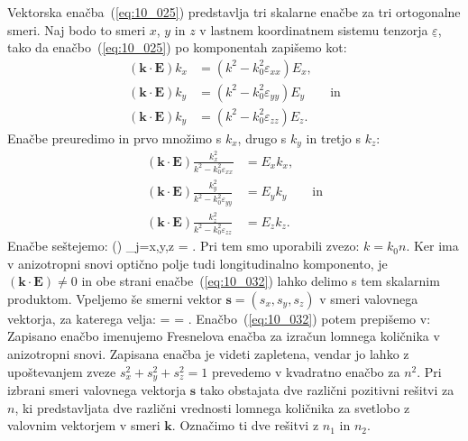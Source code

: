 Vektorska enačba~(\ref{eq:10_025}) predstavlja tri skalarne enačbe za tri 
ortogonalne smeri. Naj bodo to smeri $x$, $y$ in $z$ v lastnem koordinatnem sistemu
tenzorja $\underline{\varepsilon}$, tako da enačbo~(\ref{eq:10_025}) po komponentah 
zapišemo kot:
\begin{align}
\left(\mathbf{k}\cdot \mathbf{E}\right) k_x &= 
\left( k^2 -k_0^2 \varepsilon_{xx}\right) E_x, \label{eq:10_026}\\
\left(\mathbf{k}\cdot \mathbf{E}\right) k_y &= 
\left( k^2 -k_0^2 \varepsilon_{yy}\right) E_y \qquad \mathrm{in}\label{eq:10_027}\\
\left(\mathbf{k}\cdot \mathbf{E}\right) k_y &= \left( k^2 -k_0^2 \varepsilon_{zz}\right) E_z.
\label{eq:10_028}
\end{align}
Enačbe preuredimo in prvo množimo s $k_x$, drugo s $k_y$ in tretjo s $k_z$:
\begin{align}
\left(\mathbf{k}\cdot \mathbf{E}\right) 
\frac{k_x^2}{k^2 - k_0^2 \varepsilon_{xx}} &= E_x k_x, \label{eq:10_029}\\
\left(\mathbf{k}\cdot \mathbf{E}\right) 
\frac{k_y^2}{k^2 - k_0^2 \varepsilon_{yy}} &= E_y k_y \qquad \mathrm{in} \label{eq:10_030}\\
\left(\mathbf{k}\cdot \mathbf{E}\right) 
\frac{k_z^2}{k^2 - k_0^2 \varepsilon_{zz}} &= E_z k_z. \label{eq:10_031}
\end{align}
Enačbe seštejemo:
\beq
\left(\cdot {}\right)  
\sum_{j=x,y,z} 
 = \cdot {}.
\label{eq:10_032}
\eeq
Pri tem smo uporabili zvezo: $k = k_0 n$. Ker ima v anizotropni snovi 
optično polje tudi longitudinalno komponento, je $\left(\mathbf{k}\cdot 
\mathbf{E}\right) \neq 0$ in obe strani enačbe~(\ref{eq:10_032}) lahko 
delimo s tem skalarnim produktom.
Vpeljemo še smerni vektor $\mathbf{s} = (s_x, s_y, s_z)$ v smeri valovnega vektorja, 
za katerega velja:
\beq
{} =  = .
\label{eq:10_033}
\eeq
Enačbo~(\ref{eq:10_032}) potem prepišemo v:
Zapisano enačbo imenujemo Fresnelova enačba za izračun lomnega 
količnika v anizotropni snovi. Zapisana enačba je videti 
zapletena, vendar jo lahko z upoštevanjem zveze 
$s_x^2+s_y^2+s_z^2 = 1$ prevedemo v kvadratno enačbo za $n^2$.
Pri izbrani smeri valovnega vektorja $\mathbf{s}$ tako
obstajata dve različni pozitivni rešitvi za $n$, ki 
predstavljata dve različni vrednosti lomnega količnika za
svetlobo z valovnim vektorjem v smeri $\mathbf{k}$.
Označimo ti dve rešitvi z $n_1$ in $n_2$. 

